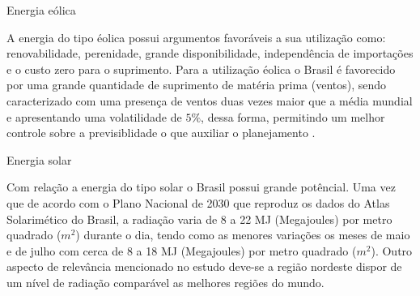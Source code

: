 \documentclass[12pt]{beamer}%
\begin{document}
\begin{frame}{Energia e\'olica}
	\begin{justify}	
		A energia do tipo \'eolica possui argumentos favor\'aveis a sua utiliza\c c\~ao como: renovabilidade, perenidade, grande
		disponibilidade, independ\^encia de importa\c c\~oes e o custo zero para o suprimento. Para a utiliza\c c\~ao \'eolica o
		Brasil \'e favorecido por uma grande quantidade de suprimento de mat\'eria prima (ventos), sendo caracterizado com uma
		presen\c ca de ventos duas vezes maior que a m\'edia mundial e apresentando uma volatilidade de $5\%$, dessa forma,
		permitindo um melhor controle sobre a previsiblidade  o que auxiliar o planejamento .
	\end{justify}
\end{frame}

\begin{frame}{Energia solar}
	\begin{justify}	
		Com rela\c c\~ao a energia do tipo solar o Brasil possui grande pot\^encial. Uma vez que de acordo com o Plano
		Nacional de 2030 que reproduz os dados do Atlas Solarim\'etico do Brasil, a radia\c c\~ao varia de 8 a 22 MJ
		(Megajoules) por metro quadrado ($m^{2}$) durante o dia, tendo como as menores varia\c c\~oes os meses de maio e de
		julho com cerca de 8 a 18 MJ (Megajoules) por metro quadrado ($m^{2}$).  Outro aspecto de relev\^ancia
		mencionado no estudo deve-se a regi\~ao nordeste  dispor de um n\'ivel de radia\c c\~ao compar\'avel as melhores
		regi\~oes do mundo.
	\end{justify}
\end{frame}
\end{document}
